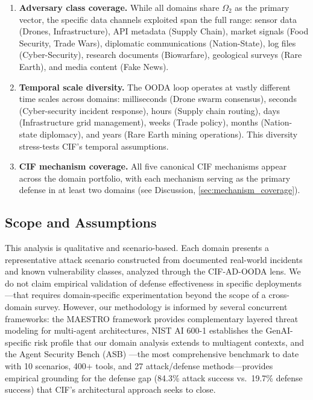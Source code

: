 \documentclass[
]{article}
\begin{document}
\begin{enumerate}
\def\labelenumi{\arabic{enumi}.}
\item
  \textbf{Adversary class coverage.} While all domains share
  \(\Omega_2\) as the primary vector, the specific data channels
  exploited span the full range: sensor data (Drones, Infrastructure),
  API metadata (Supply Chain), market signals (Food Security, Trade
  Wars), diplomatic communications (Nation-State), log files
  (Cyber-Security), research documents (Biowarfare), geological surveys
  (Rare Earth), and media content (Fake News).
\item
  \textbf{Temporal scale diversity.} The OODA loop operates at vastly
  different time scales across domains: milliseconds (Drone swarm
  consensus), seconds (Cyber-security incident response), hours (Supply
  chain routing), days (Infrastructure grid management), weeks (Trade
  policy), months (Nation-state diplomacy), and years (Rare Earth mining
  operations). This diversity stress-tests CIF's temporal assumptions.
\item
  \textbf{CIF mechanism coverage.} All five canonical CIF mechanisms
  appear across the domain portfolio, with each mechanism serving as the
  primary defense in at least two domains (see Discussion,
  \cref{sec:mechanism_coverage}).
\end{enumerate}

\subsection{Scope and Assumptions}\label{scope-and-assumptions}

This analysis is qualitative and scenario-based. Each domain presents a
representative attack scenario constructed from documented real-world
incidents and known vulnerability classes, analyzed through the
CIF-AD-OODA lens. We do not claim empirical validation of defense
effectiveness in specific deployments---that requires domain-specific
experimentation beyond the scope of a cross-domain survey. However, our
methodology is informed by several concurrent frameworks: the MAESTRO
framework \cite{csa2025maestro} provides complementary layered threat
modeling for multi-agent architectures, NIST AI 600-1
\cite{nist2024genai} establishes the GenAI-specific risk profile that
our domain analysis extends to multiagent contexts, and the Agent
Security Bench (ASB) \cite{zhang2025asb}---the most comprehensive
benchmark to date with 10 scenarios, 400+ tools, and 27 attack/defense
methods---provides empirical grounding for the defense gap (84.3\%
attack success vs.~19.7\% defense success) that CIF's architectural
approach seeks to close.
\end{document}

